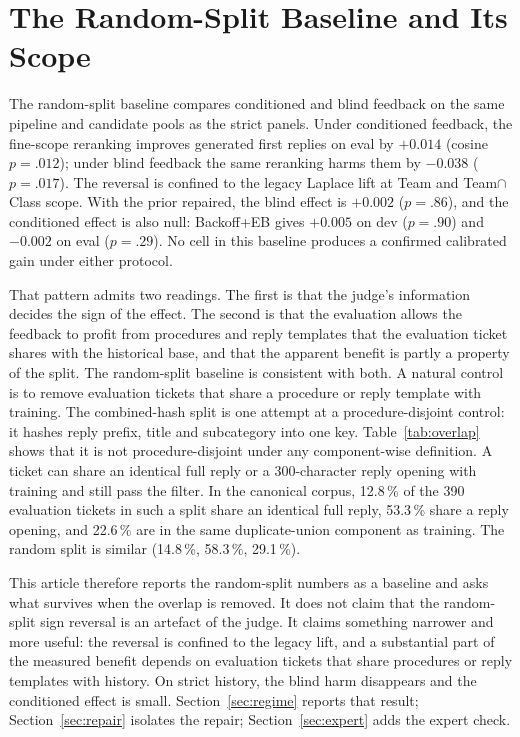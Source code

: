 \section{The Random-Split Baseline and Its Scope}
\label{sec:baseline}

The random-split baseline compares conditioned and blind feedback on the same
pipeline and candidate pools as the strict panels. Under conditioned feedback, the fine-scope reranking improves generated
first replies on eval by $+0.014$ (cosine $p=.012$); under blind feedback the same
reranking harms them by $-0.038$ ($p=.017$). The reversal is confined to the legacy
Laplace lift at Team and Team$\cap$Class scope. With the prior repaired, the blind
effect is $+0.002$ ($p=.86$), and the conditioned effect is also null: Backoff+EB
gives $+0.005$ on dev ($p=.90$) and $-0.002$ on eval ($p=.29$). No cell in this
baseline produces a confirmed calibrated gain under either protocol.

That pattern admits two readings. The first is that the judge's information decides
the sign of the effect. The second is that the evaluation allows the feedback to
profit from procedures and reply templates that the evaluation ticket shares with
the historical base, and that the apparent benefit is partly a property of the
split. The random-split baseline is consistent with both. A natural control is to
remove evaluation tickets that share a procedure or reply template with training.
The combined-hash split is one attempt at a procedure-disjoint control: it hashes
reply prefix, title and subcategory into one key. Table~\ref{tab:overlap} shows that it is not
procedure-disjoint under any component-wise definition. A ticket can share an identical full reply or a
300-character reply opening with training and still pass the filter. In the
canonical corpus, 12.8\,\% of the 390 evaluation tickets in such a split share an
identical full reply, 53.3\,\% share a reply opening, and 22.6\,\% are in the same
duplicate-union component as training. The random split is similar (14.8\,\%,
58.3\,\%, 29.1\,\%).

This article therefore reports the random-split numbers as a baseline and asks what
survives when the overlap is removed. It does not claim that the random-split sign
reversal is an artefact of the judge. It claims something narrower and more useful:
the reversal is confined to the legacy lift, and a substantial part of the measured
benefit depends on evaluation tickets that share procedures or reply templates with
history. On strict history, the blind harm disappears and the conditioned effect is
small. Section~\ref{sec:regime} reports that result; Section~\ref{sec:repair}
isolates the repair; Section~\ref{sec:expert} adds the expert check.
